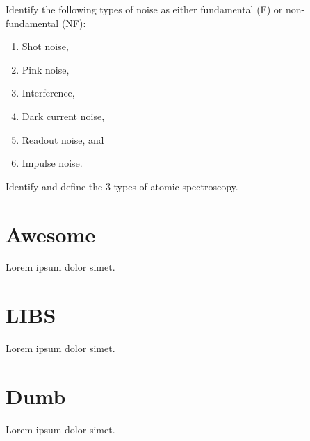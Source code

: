 \documentclass{hw}
\begin{document}
\solution



\problem{}

Identify the following types of noise as either fundamental (F) or non-fundamental (NF):
\begin{enumerate}
    \item Shot noise,
    \item Pink noise,
    \item Interference,
    \item Dark current noise,
    \item Readout noise, and
    \item Impulse noise.
\end{enumerate}

\solution



\problem{}

Identify and define the 3 types of atomic spectroscopy.

\solution

\part{Awesome}
Lorem ipsum dolor simet.

\part{LIBS}
Lorem ipsum dolor simet.

\part{Dumb}
Lorem ipsum dolor simet.
\end{document}
